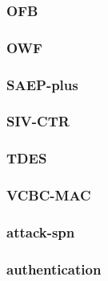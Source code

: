 \begin{frame}\frametitle{OFB}
\begin{figure}
\begin{center}

\end{center}
\end{figure}
\end{frame}
\begin{frame}\frametitle{OWF}
\begin{figure}
\begin{center}

\end{center}
\end{figure}
\end{frame}
\begin{frame}\frametitle{SAEP-plus}
\begin{figure}
\begin{center}

\end{center}
\end{figure}
\end{frame}
\begin{frame}\frametitle{SIV-CTR}
\begin{figure}
\begin{center}

\end{center}
\end{figure}
\end{frame}
\begin{frame}\frametitle{TDES}
\begin{figure}
\begin{center}

\end{center}
\end{figure}
\end{frame}
\begin{frame}\frametitle{VCBC-MAC}
\begin{figure}
\begin{center}

\end{center}
\end{figure}
\end{frame}
\begin{frame}\frametitle{attack-spn}
\begin{figure}
\begin{center}

\end{center}
\end{figure}
\end{frame}
\begin{frame}\frametitle{authentication}
\begin{figure}
\begin{center}

\end{center}
\end{figure}
\end{frame}
